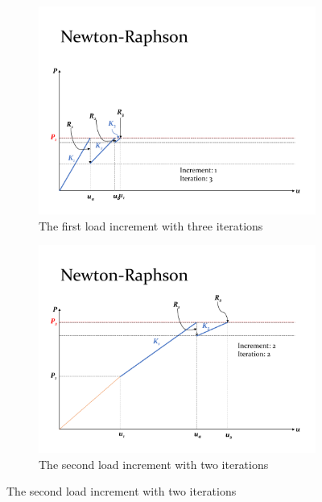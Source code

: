 \documentclass{article}
\begin{document}
\begin{figure}[ht]
    \centering
        \begin{subfigure}{0.64\textwidth}
            \includegraphics[width=1\linewidth]{figures/nr1.pdf} 
            \caption{The first load increment with three iterations}
            \label{fig:nr1}
        \end{subfigure}
        
        \begin{subfigure}{0.64\textwidth}
            \includegraphics[width=1\linewidth]{figures/nr2.pdf} 
            \caption{The second load increment with two iterations}
            \label{fig:nr2}
        \end{subfigure}
        

\end{figure}
\end{document}
